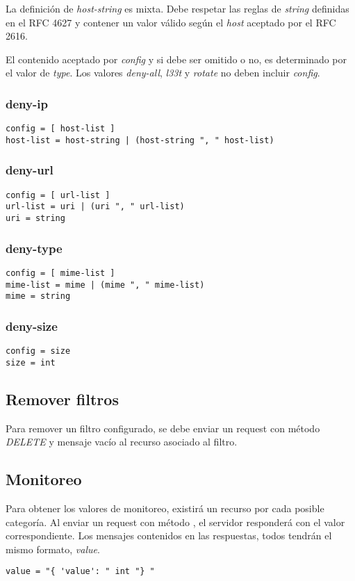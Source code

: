 \documentclass[11pt,a4paper,titlepage]{article}
\begin{document}
La definición de \textit{host-string} es mixta.
Debe respetar las reglas de \textit{string} definidas en el RFC 4627 y contener un valor válido según el \textit{host} aceptado por el RFC 2616.

El contenido aceptado por \textit{config} y si debe ser omitido o no, es determinado por el valor de \textit{type}.
Los valores \textit{deny-all}, \textit{l33t} y \textit{rotate} no deben incluir \textit{config}.
\subsubsection{deny-ip}
\begin{verbatim}
config = [ host-list ]
host-list = host-string | (host-string ", " host-list)
\end{verbatim}

\subsubsection{deny-url}
\begin{verbatim}
config = [ url-list ]
url-list = uri | (uri ", " url-list)
uri = string
\end{verbatim}

\subsubsection{deny-type}
\begin{verbatim}
config = [ mime-list ]
mime-list = mime | (mime ", " mime-list)
mime = string
\end{verbatim}

\subsubsection{deny-size}
\begin{verbatim}
config = size
size = int
\end{verbatim}

\subsection{Remover filtros}
Para remover un filtro configurado, se debe enviar un request con método \textit{DELETE} y mensaje vacío al recurso asociado al filtro.

\subsection{Monitoreo}
Para obtener los valores de monitoreo, existirá un recurso por cada posible categoría.
Al enviar un request con método , el servidor responderá con el valor correspondiente.
Los mensajes contenidos en las respuestas, todos tendrán el mismo formato, \textit{value}.
\begin{verbatim}
value = "{ 'value': " int "} "
\end{verbatim}
\end{document}
